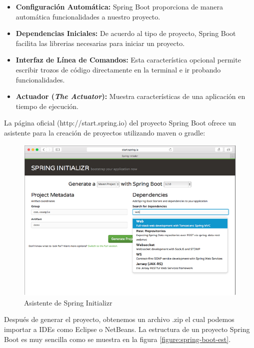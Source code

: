 		\begin{itemize}
		  \item {\bf Configuración Automática:} {Spring Boot proporciona de manera
		  automática funcionalidades a nuestro proyecto.}
		  
		  \item {\bf Dependencias Iniciales:} {De acuerdo al tipo de proyecto, Spring
		  Boot facilita las librerias necesarias para iniciar un proyecto.}
		  
		  \item {\bf Interfaz de Línea de Comandos:} {Esta característica opcional
		  permite escribir trozos de código directamente en la terminal e ir
		  probando funcionalidades.}
		  
		  \item {\bf Actuador (\textit{The Actuator}):} {Muestra características de
		  una aplicación en tiempo de ejecución.}
		\end{itemize}
		
		La página oficial (http://start.spring.io) del proyecto Spring Boot ofrece un
		asistente para la creación de proyectos utilizando maven o gradle:
		
		\begin{figure}[H]
		    \centering
			\includegraphics[width=14cm]{../imgs/ejemplos/spring-boot.png}
			\caption{Asistente de Spring Initializr}
			\label{figure:spring-boot}
		\end{figure}
		
		Después de generar el proyecto, obtenemos un archivo .zip el cual podemos
		importar a IDEs como Eclipse o NetBeans. La estructura de un proyecto Spring
		Boot es muy sencilla como se muestra en la figura
		\ref{figure:spring-boot-est}.

